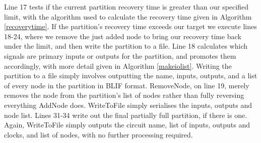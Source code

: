 \documentclass[12pt,final,oneside]{dwThesis} %
\begin{document}
   Line 17 tests if the current partition recovery time is greater than our specified limit, with the algorithm used to calculate the recovery time given in Algorithm \ref{recoverytime}.
   If the partition's recovery time exceeds our target we execute lines 18-24, where we remove the just added node to bring our recovery time back under the limit, and then write the partition to a file.
   Line 18 calculates which signals are primary inputs or outputs for the partition, and promotes them accordingly, with more detail given in Algorithm \ref{makeiolist}.
   Writing the partition to a file simply involves outputting the name, inputs, outputs, and a list of every node in the partition in \gls{BLIF} format.
   RemoveNode, on line 19, merely removes the node from the partition's list of nodes rather than fully reversing everything AddNode does. WriteToFile simply serialises the inputs, outputs and node list.
   Lines 31-34 write out the final partially full partition, if there is one. Again, WriteToFile simply outputs the circuit name, list of inputs, outputs and clocks, and list of nodes, with no further processing required.


   \newpage
\end{document}
